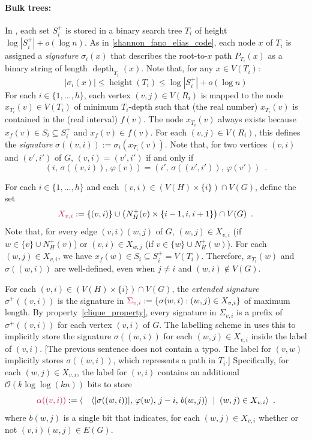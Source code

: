 \documentclass{patmorin}
\makeatletter
\renewcommand{\le}{\leqslant}
\newcommand{\defin}[1]{\emph{\textcolor{brightmaroon}{#1}}}
\def\mathcolor#1#{\@mathcolor{#1}}
\def\@mathcolor#1#2#3{%
  \protect\leavevmode
  \begingroup
    \color#1{#2}#3%
  \endgroup
}
\newcommand{\mathdefin}[1]{\mathcolor{brightmaroon}{#1}}
\DeclareMathOperator{\height}{height}
\DeclareMathOperator{\depth}{depth}
\newcommand{\Oh}{\calO}
\newcommand{\calO}{\mathcal{O}}
\makeatother
\begin{document}
  \paragraph{Bulk trees:}
  In \cite{dujmovic.esperet.ea:adjacency}, each set $S^+_i$ is stored in a binary search tree $T_i$ of height $\log|S^+_i|+o(\log n)$.
  As in \cref{shannon_fano_elias_code}, each node $x$ of $T_i$ is assigned a \defin{signature} \defin{$\sigma_i(x)$} that describes the root-to-$x$ path $P_{T_i}(x)$ as a binary string of length $\depth_{T_i}(x)$.
  Note that, for any $x\in V(T_i)$:
  \[
    |\sigma_i(x)| \le \height(T_i) \le \log|S^+_i|+o(\log n)
  \]
  For each $i\in\{1,\ldots,h\}$, each vertex $(v,j)\in V(R_i)$ is mapped to the node $x_{T_i}(v)\in V(T_i)$ of minimum $T_i$-depth such that (the real number) $x_{T_i}(v)$ is contained in the (real interval) $f(v)$.
  The node $x_{T_i}(v)$ always exists because $x_f(v)\in S_i\subseteq S_i^+$ and $x_f(v)\in f(v)$.
  For each $(v,j)\in V(R_i)$, this defines the \defin{signature} $\sigma((v,i)):=\sigma_i(x_{T_i}(v))$.  Note that, for two vertices $(v,i)$ and $(v',i')$ of $G$, $(v,i)=(v',i')$ if and only if
  \begin{equation}
     (i,\,\sigma((v,i)),\,\varphi(v)) = (i',\,\sigma((v',i')),\,\varphi(v')) \enspace .
     \label{ps_identity}
  \end{equation}

  For each $i\in\{1,\ldots,h\}$ and each $(v,i)\in (V(H)\times\{i\})\cap V(G)$, define the set
  \[
     \mathdefin{X_{v,i}}:= \{(v,i)\}\cup \left(N_H^+(v)\times\{i-1,i,i+1\}\right)\cap V(G) \enspace .
  \]
  Note that, for every edge $(v,i)(w,j)$ of $G$, $(w,j)\in X_{v,i}$ (if $w\in \{v\}\cup N^+_H(v)$) or $(v,i)\in X_{w,j}$ (if $v\in \{w\}\cup N^+_H(w)$).
  For each $(w,j)\in X_{v,i}$, we have $x_f(w)\in S_i\subseteq S^+_i=V(T_i)$. Therefore, $x_{T_i}(w)$ and $\sigma((w,i))$ are well-defined, even when $j\neq i$ and $(w,i)\not\in V(G)$.

  For each $(v,i)\in (V(H)\times\{i\})\cap V(G)$, the \defin{extended signature} \defin{$\sigma^+((v,i))$} is the signature in $\mathdefin{\Sigma_{v,i}}:=\{\sigma(w,i):(w,j)\in X_{v,i}\}$ of maximum length.
  By property~\ref{clique_property}, every signature in $\Sigma_{v,i}$ is a prefix of $\sigma^+((v,i))$ for each vertex $(v,i)$ of $G$.
  The labelling scheme in \cite{dujmovic.esperet.ea:adjacency} uses this to implicitly store the signature $\sigma((w,i))$ for each $(w,j)\in X_{v,i}$ inside the label of $(v,i)$. [The previous sentence does not contain a typo. The label for $(v,w)$ implicitly stores $\sigma((w,i))$, which represents a path in $T_i$.]
  Specifically, for each $(w,j)\in X_{v,i}$, the label for $(v,i)$ contains an additional $\Oh(k\log\log (kn))$ bits to store
  \begin{equation}
     \mathdefin{\alpha((v,i))}:= \langle \quad\langle|\sigma((w,i))|,\, \varphi(w),\, j-i,\, b(w,j)\rangle\; \mid\; (w,j)\in X_{v,i}\rangle \enspace .
     \label{four_tuple}
  \end{equation}
  where $b(w,j)$ is a single bit that indicates, for each $(w,j)\in X_{v,i}$ whether or not $(v,i)(w,j)\in E(G)$.
\end{document}
